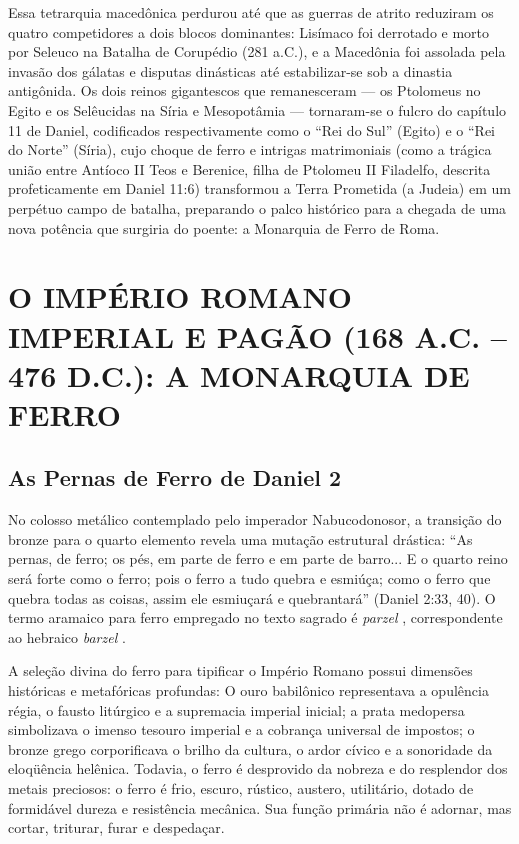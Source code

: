 Essa tetrarquia macedônica perdurou até que as guerras de atrito reduziram os quatro competidores a dois blocos dominantes: Lisímaco foi derrotado e morto por Seleuco na Batalha de Corupédio (281 a.C.), e a Macedônia foi assolada pela invasão dos gálatas e disputas dinásticas até estabilizar-se sob a dinastia antigônida. Os dois reinos gigantescos que remanesceram — os Ptolomeus no Egito e os Selêucidas na Síria e Mesopotâmia — tornaram-se o fulcro do capítulo 11 de Daniel, codificados respectivamente como o ``Rei do Sul'' (Egito) e o ``Rei do Norte'' (Síria), cujo choque de ferro e intrigas matrimoniais (como a trágica união entre Antíoco II Teos e Berenice, filha de Ptolomeu II Filadelfo, descrita profeticamente em Daniel 11:6) transformou a Terra Prometida (a Judeia) em um perpétuo campo de batalha, preparando o palco histórico para a chegada de uma nova potência que surgiria do poente: a Monarquia de Ferro de Roma.



\section{O IMPÉRIO ROMANO IMPERIAL E PAGÃO (168 A.C. – 476 D.C.): A MONARQUIA DE FERRO}



\subsection{As Pernas de Ferro de Daniel 2}


No colosso metálico contemplado pelo imperador Nabucodonosor, a transição do bronze para o quarto elemento revela uma mutação estrutural drástica:
``As pernas, de ferro; os pés, em parte de ferro e em parte de barro... E o quarto reino será forte como o ferro; pois o ferro a tudo quebra e esmiúça; como o ferro que quebra todas as coisas, assim ele esmiuçará e quebrantará'' (Daniel 2:33, 40).
O termo aramaico para ferro empregado no texto sagrado é \textit{parzel} , correspondente ao hebraico \textit{barzel} .

A seleção divina do ferro para tipificar o Império Romano possui dimensões históricas e metafóricas profundas:
O ouro babilônico representava a opulência régia, o fausto litúrgico e a supremacia imperial inicial; a prata medopersa simbolizava o imenso tesouro imperial e a cobrança universal de impostos; o bronze grego corporificava o brilho da cultura, o ardor cívico e a sonoridade da eloqüência helênica. Todavia, o ferro é desprovido da nobreza e do resplendor dos metais preciosos: o ferro é frio, escuro, rústico, austero, utilitário, dotado de formidável dureza e resistência mecânica. Sua função primária não é adornar, mas cortar, triturar, furar e despedaçar.

